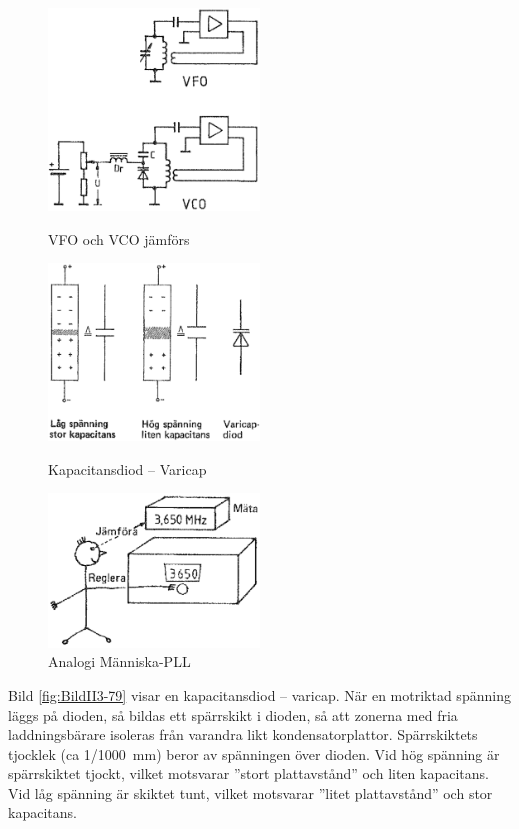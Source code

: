 \begin{figure}
  \includegraphics[width=0.5\textwidth]{images/cropped_pdfs/bild_2_3-78.pdf}
  \caption{VFO och VCO jämförs}
  \label{fig:BildII3-78}

  \includegraphics[width=0.5\textwidth]{images/cropped_pdfs/bild_2_3-79.pdf}
  \caption{Kapacitansdiod -- Varicap}
  \label{fig:BildII3-79}

  \includegraphics[width=0.5\textwidth]{images/cropped_pdfs/bild_2_3-80a.pdf}
  \caption{Analogi Människa-PLL}
  \label{fig:BildII3-80a}
\end{figure}

Bild \ref{fig:BildII3-79} visar en kapacitansdiod -- varicap.
När en motriktad spänning läggs på dioden, så bildas ett spärrskikt i dioden,
så att zonerna med fria laddningsbärare isoleras från varandra likt
kondensatorplattor.
Spärrskiktets tjocklek (ca 1/1000~mm) beror av spänningen över dioden.
Vid hög spänning är spärrskiktet tjockt, vilket motsvarar
''stort plattavstånd'' och liten kapacitans.
Vid låg spänning är skiktet tunt, vilket motsvarar ''litet plattavstånd'' och
stor kapacitans.

